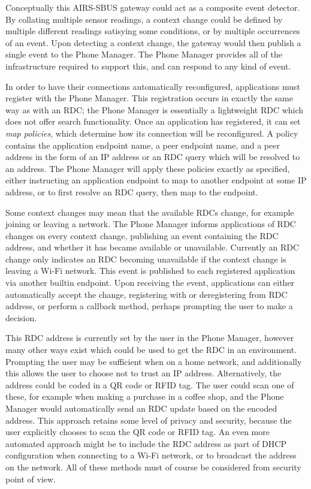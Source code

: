 \documentclass[12pt,twoside,notitlepage]{report}
\begin{document}
Conceptually this AIRS-SBUS gateway could act as a composite event detector. 
By collating multiple sensor readings, a context change could be defined by multiple different readings satisying some conditions, or by multiple occurrences of an event.
Upon detecting a context change, the gateway would then publish a single event to the Phone Manager. 
The Phone Manager provides all of the infrastructure required to support this, and can respond to any kind of event. 

In order to have their connections automatically reconfigured, applications must register with the Phone Manager. 
This registration occurs in exactly the same way as with an RDC; the Phone Manager is essentially a lightweight RDC which does not offer search functionality. 
Once an application has registered, it can set {\sl map policies}, which determine how its connection will be reconfigured. 
A policy contains the application endpoint name, a peer endpoint name, and a peer address in the form of an IP address or an RDC query which will be resolved to an address. 
The Phone Manager will apply these policies exactly as specified, either instructing an application endpoint to map to another endpoint at some IP address, or to first resolve an RDC query, then map to the endpoint. 

Some context changes may mean that the available RDCs change, for example joining or leaving a network. 
The Phone Manager informs applications of RDC changes on every context change, publishing an event containing the RDC address, and whether it has became available or unavailable. 
Currently an RDC change only indicates an RDC becoming unavailable if the context change is leaving a Wi-Fi network. 
This event is published to each registered application via another builtin endpoint. 
Upon receiving the event, applications can either automatically accept the change, registering with or deregistering from RDC address, or perform a callback method, perhaps prompting the user to make a decision. 

This RDC address is currently set by the user in the Phone Manager, however many other ways exist which could be used to get the RDC in an environment. 
Prompting the user may be sufficient when on a home network, and additionally this allows the user to choose not to trust an IP address. 
Alternatively, the address could be coded in a QR code or RFID tag. 
The user could scan one of these, for example when making a purchase in a coffee shop, and the Phone Manager would automatically send an RDC update based on the encoded address. 
This approach retains some level of privacy and security, because the user explicitly chooses to scan the QR code or RFID tag. 
An even more automated approach might be to include the RDC address as part of DHCP configuration when connecting to a Wi-Fi network, or to broadcast the address on the network. 
All of these methods must of course be considered from security point of view. 
\end{document}
